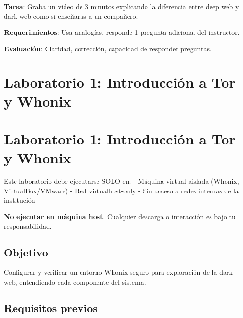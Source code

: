 \documentclass[
  letterpaper,
]{report}
\begin{document}
\textbf{Tarea}: Graba un video de 3 minutos explicando la diferencia
entre deep web y dark web como si enseñaras a un compañero.

\textbf{Requerimientos}: Usa analogías, responde 1 pregunta adicional
del instructor.

\textbf{Evaluación}: Claridad, corrección, capacidad de responder
preguntas.

\chapter{Laboratorio 1: Introducción a Tor y
Whonix}\label{laboratorio-1-introducciuxf3n-a-tor-y-whonix}

\chapter{Laboratorio 1: Introducción a Tor y
Whonix}\label{laboratorio-1-introducciuxf3n-a-tor-y-whonix-1}

\begin{tcolorbox}[enhanced jigsaw, arc=.35mm, bottomrule=.15mm, bottomtitle=1mm, breakable, colback=white, colbacktitle=quarto-callout-warning-color!10!white, colframe=quarto-callout-warning-color-frame, coltitle=black, left=2mm, leftrule=.75mm, opacityback=0, opacitybacktitle=0.6, rightrule=.15mm, title=\textcolor{quarto-callout-warning-color}{\faExclamationTriangle}\hspace{0.5em}{ADVERTENCIA DE SEGURIDAD}, titlerule=0mm, toprule=.15mm, toptitle=1mm]

Este laboratorio debe ejecutarse SOLO en: - Máquina virtual aislada
(Whonix, VirtualBox/VMware) - Red virtualhost-only - Sin acceso a redes
internas de la institución

\textbf{No ejecutar en máquina host}. Cualquier descarga o interacción
es bajo tu responsabilidad.

\end{tcolorbox}

\section{Objetivo}\label{objetivo}

Configurar y verificar un entorno Whonix seguro para exploración de la
dark web, entendiendo cada componente del sistema.

\section{Requisitos previos}\label{requisitos-previos}
\end{document}
